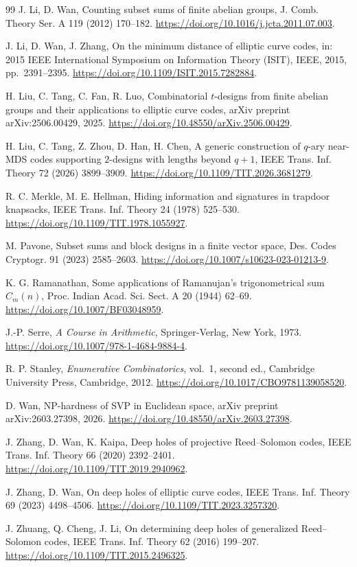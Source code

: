 \documentclass[11pt]{article}
\theoremstyle{definition}
\begin{document}
\begin{thebibliography}{99}
	J. Li, D. Wan,
	Counting subset sums of finite abelian groups,
	J. Comb. Theory Ser. A 119 (2012) 170--182.
	\url{https://doi.org/10.1016/j.jcta.2011.07.003}.
	
	J. Li, D. Wan, J. Zhang,
	On the minimum distance of elliptic curve codes,
	in: 2015 IEEE International Symposium on Information Theory (ISIT),
	IEEE, 2015, pp.~2391--2395.
	\url{https://doi.org/10.1109/ISIT.2015.7282884}.
	
	
	H. Liu, C. Tang, C. Fan, R. Luo,
	Combinatorial $t$-designs from finite abelian groups and their applications to elliptic curve codes,
	arXiv preprint arXiv:2506.00429, 2025.
	\url{https://doi.org/10.48550/arXiv.2506.00429}.
	
	H. Liu, C. Tang, Z. Zhou, D. Han, H. Chen,
	A generic construction of $q$-ary near-MDS codes supporting $2$-designs with lengths beyond $q+1$,
	IEEE Trans. Inf. Theory 72 (2026) 3899--3909.
	\url{https://doi.org/10.1109/TIT.2026.3681279}.
	
	R. C. Merkle, M. E. Hellman,
	Hiding information and signatures in trapdoor knapsacks,
	IEEE Trans. Inf. Theory 24 (1978) 525--530.
	\url{https://doi.org/10.1109/TIT.1978.1055927}.
	
	
	M. Pavone,
	Subset sums and block designs in a finite vector space,
	Des. Codes Cryptogr. 91 (2023) 2585--2603.
	\url{https://doi.org/10.1007/s10623-023-01213-9}.
	
	K. G. Ramanathan,
	Some applications of Ramanujan's trigonometrical sum $C_m(n)$,
	Proc. Indian Acad. Sci. Sect. A 20 (1944) 62--69.
	\url{https://doi.org/10.1007/BF03048959}.
	
	J.-P. Serre,
	\textit{A Course in Arithmetic},
	Springer-Verlag, New York, 1973.
	\url{https://doi.org/10.1007/978-1-4684-9884-4}.
	
	R. P. Stanley,
	\textit{Enumerative Combinatorics}, vol.~1, second ed.,
	Cambridge University Press, Cambridge, 2012.
	\url{https://doi.org/10.1017/CBO9781139058520}.
	
	
	D. Wan,
	NP-hardness of SVP in Euclidean space,
	arXiv preprint arXiv:2603.27398, 2026.
	\url{https://doi.org/10.48550/arXiv.2603.27398}.
	
	J. Zhang, D. Wan, K. Kaipa,
	Deep holes of projective Reed--Solomon codes,
	IEEE Trans. Inf. Theory 66 (2020) 2392--2401.
	\url{https://doi.org/10.1109/TIT.2019.2940962}.
	
	J. Zhang, D. Wan,
	On deep holes of elliptic curve codes,
	IEEE Trans. Inf. Theory 69 (2023) 4498--4506.
	\url{https://doi.org/10.1109/TIT.2023.3257320}.
	

	
	J. Zhuang, Q. Cheng, J. Li,
	On determining deep holes of generalized Reed--Solomon codes,
	IEEE Trans. Inf. Theory 62 (2016) 199--207.
	\url{https://doi.org/10.1109/TIT.2015.2496325}.
	
	
\end{thebibliography}
\end{document}
